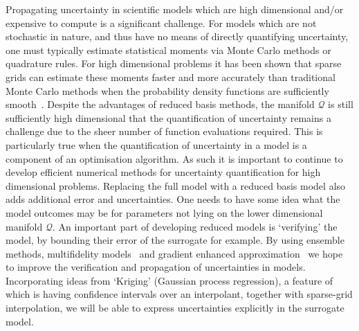 Propagating uncertainty in scientific models which are high
dimensional and/or expensive to compute is a significant challenge.
For models which are not stochastic in nature, and thus have no means
of directly quantifying uncertainty, one must typically estimate
statistical moments via Monte Carlo methods or quadrature rules. For
high dimensional problems it has been shown that sparse grids can
estimate these moments faster and more accurately than traditional
Monte Carlo methods when the probability density functions are
sufficiently
smooth~\parencite{JakemanRoberts2013,FranzelinDiehlPfluger2014}.
Despite the advantages of reduced basis methods, the manifold
$\mathcal{Q}$ is still sufficiently high dimensional that the
quantification of uncertainty remains a challenge due to the sheer
number of function evaluations required. This is particularly true
when the quantification of uncertainty in a model is a component of an
optimisation algorithm. As such it is important to continue to
develop efficient numerical methods for uncertainty quantification
for high dimensional problems. Replacing the full model with a reduced
basis model also adds additional error and uncertainties. One needs to
have some idea what the model outcomes may be for parameters not lying
on the lower dimensional manifold $\mathcal{Q}$. An important part of
developing reduced models is `verifying' the model, by bounding their
error of the surrogate for example. By using ensemble methods,
multifidelity models~\parencite{NgWillcox2014} and gradient enhanced
approximation~\parencite{deBaarHarding2015,Jakeman2015} we hope to
improve the verification and propagation of uncertainties in models.
Incorporating ideas from `Kriging' (Gaussian process regression), a
feature of which is having confidence intervals over an interpolant,
together with sparse-grid interpolation, we will be able to express
uncertainties explicitly in the surrogate model.

